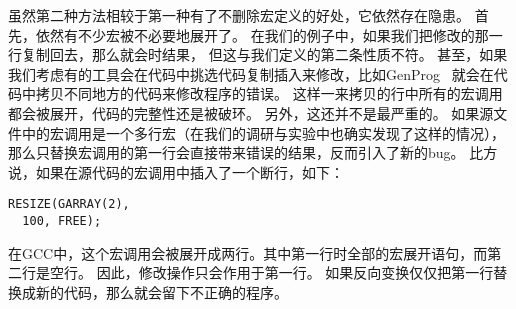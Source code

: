 虽然第二种方法相较于第一种有了不删除宏定义的好处，它依然存在隐患。
首先，依然有不少宏被不必要地展开了。
在我们的例子中，如果我们把修改的那一行复制回去，那么就会时结果，
但这与我们定义的第二条性质不符。
甚至，如果我们考虑有的工具会在代码中挑选代码复制插入来修改，比如GenProg~\cite{le2012genprog}
就会在代码中拷贝不同地方的代码来修改程序的错误。
这样一来拷贝的行中所有的宏调用都会被展开，代码的完整性还是被破环。
另外，这还并不是最严重的。
如果源文件中的宏调用是一个多行宏（在我们的调研与实验中也确实发现了这样的情况），
那么只替换宏调用的第一行会直接带来错误的结果，反而引入了新的bug。
比方说，如果在源代码的宏调用中插入了一个断行，如下：
\begin{lstlisting}
RESIZE(GARRAY(2),
  100, FREE);
\end{lstlisting}
在GCC中，这个宏调用会被展开成两行。其中第一行时全部的宏展开语句，而第二行是空行。
因此，修改操作只会作用于第一行。
如果反向变换仅仅把第一行替换成新的代码，那么就会留下不正确的程序。



